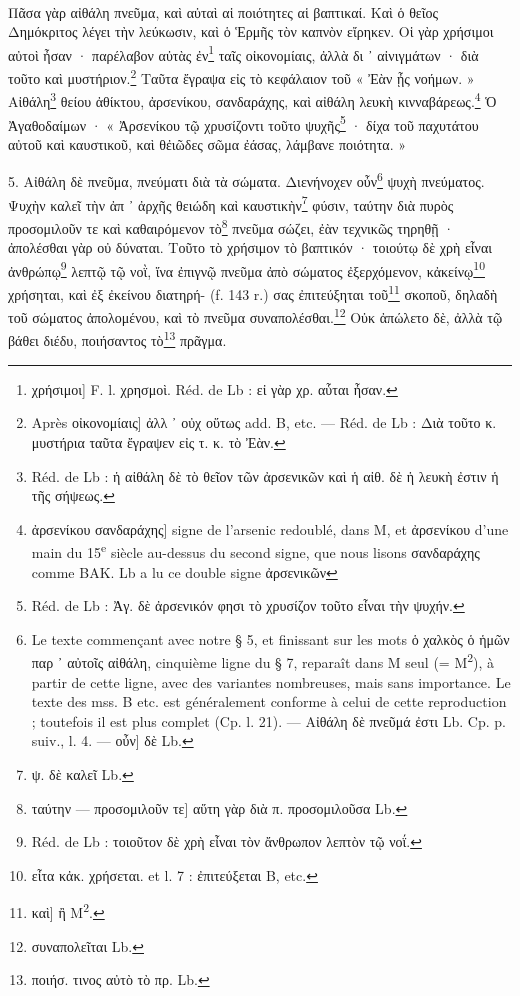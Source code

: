 \documentclass[a4paper, 11pt, oneside, polutonikogreek, french]{article}
\begin{document}
\paragraph{}
Πᾶσα γὰρ αἰθάλη πνεῦμα, καὶ αὐταὶ αἱ ποιότητες αἱ βαπτικαί. Καὶ ὁ θεῖος Δημόκριτος λέγει τὴν λεύκωσιν, καὶ ὁ Ἑρμῆς τὸν καπνὸν εἴρηκεν. Οἱ γὰρ χρήσιμοι αὐτοὶ ἦσαν · παρέλαβον αὐτὰς ἐν\footnote{χρήσιμοι] F. l. χρησμοὶ. Réd. de Lb : εἰ γὰρ χρ. αὗται ἦσαν.} ταῖς οἰκονομίαις, ἀλλὰ δι ᾽ αἰνιγμάτων · διὰ τοῦτο καὶ μυστήριον.\footnote{Après οἰκονομίαις] ἀλλ ᾽ οὐχ οὕτως add. B, etc. --- Réd. de Lb : Διὰ τοῦτο κ. μυστήρια ταῦτα ἔγραψεν εἰς τ. κ. τὸ Ἐὰν.} Ταῦτα ἔγραψα εἰς τὸ κεφάλαιον τοῦ « Ἐὰν ᾖς νοήμων. » Αἰθάλη\footnote{Réd. de Lb : ἡ αἰθάλη δὲ τὸ θεῖον τῶν ἀρσενικῶν καὶ ἡ αἰθ. δὲ ἡ λευκὴ ἐστιν ἡ τῆς σήψεως.} θείου ἀθίκτου, ἀρσενίκου, σανδαράχης, καὶ αἰθάλη λευκὴ κινναβάρεως.\footnote{ἀρσενίκου σανδαράχης] signe de l'arsenic redoublé, dans M, et ἀρσενίκου d'une main du 15\textsuperscript{e} siècle au-dessus du second signe, que nous lisons σανδαράχης comme BAK. Lb a lu ce double signe ἀρσενικῶν} Ὁ Ἀγαθοδαίμων · « Ἀρσενίκου τῷ χρυσίζοντι τοῦτο ψυχῆς\footnote{Réd. de Lb : Ἀγ. δὲ ἀρσενικόν φησι τὸ χρυσίζον τοῦτο εἶναι τὴν ψυχήν.} · δίχα τοῦ παχυτάτου αὐτοῦ καὶ καυστικοῦ, καὶ θἐιῶδες σῶμα ἐάσας, λάμβανε ποιότητα. »

5. Αἰθάλη δὲ πνεῦμα, πνεύματι διὰ τὰ σώματα. Διενήνοχεν οὖν\footnote{Le texte commençant avec notre § 5, et finissant sur les mots ὁ χαλκὸς ὁ ἡμῶν παρ ᾽ αὐτοῖς αἰθάλη, cinquième ligne du § 7, reparaît dans M seul (= M\textsuperscript{2}), à partir de cette ligne, avec des variantes nombreuses, mais sans importance. Le texte des mss. B etc. est généralement conforme à celui de cette reproduction ; toutefois il est plus complet (Cp. l. 21). --- Αἰθάλη δὲ πνεῦμά ἐστι Lb. Cp. p. suiv., l. 4. --- οὖν] δὲ Lb.} ψυχὴ πνεύματος. Ψυχὴν καλεῖ τὴν ἀπ ᾽ ἀρχῆς θειώδη καὶ καυστικὴν\footnote{ψ. δὲ καλεῖ Lb.} φύσιν, ταύτην διὰ πυρὸς προσομιλοῦν τε καὶ καθαιρόμενον τὸ\footnote{ταύτην --- προσομιλοῦν τε] αὕτη γὰρ διὰ π. προσομιλοῦσα Lb.} πνεῦμα σώζει, ἐὰν τεχνικῶς τηρηθῇ · ἀπολέσθαι γὰρ οὐ δύναται. Τοῦτο τὸ χρήσιμον τὸ βαπτικόν · τοιούτῳ δὲ χρὴ εἶναι ἀνθρώπῳ\footnote{Réd. de Lb : τοιοῦτον δὲ χρὴ εἶναι τὸν ἄνθρωπον λεπτὸν τῷ νοΐ.} λεπτῷ τῷ νοῒ, ἵνα ἐπιγνῷ πνεῦμα ἀπὸ σώματος ἐξερχόμενον, κἀκείνῳ\footnote{εἶτα κἀκ. χρήσεται. et l. 7 : ἐπιτεύξεται B, etc.} χρήσηται, καὶ ἐξ ἐκείνου διατηρή- (f. 143 r.) σας ἐπιτεύξηται τοῦ\footnote{καὶ] ἢ M\textsuperscript{2}.} σκοποῦ, δηλαδὴ τοῦ σώματος ἀπολομένου, καὶ τὸ πνεῦμα συναπολέσθαι.\footnote{συναπολεῖται Lb.} Οὐκ ἀπώλετο δὲ, ἀλλὰ τῷ βάθει διέδυ, ποιήσαντος τὸ\footnote{ποιήσ. τινος αὐτὸ τὸ πρ. Lb.} πρᾶγμα.
\end{document}
